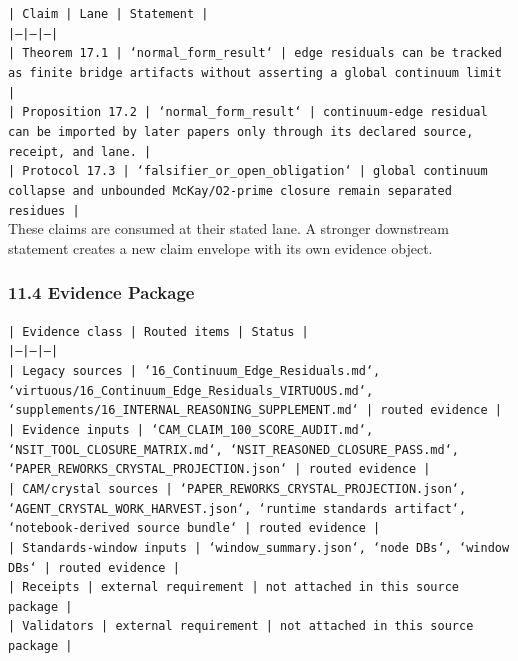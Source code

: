 \documentclass[11pt]{article}
\begin{document}
\noindent\texttt{| Claim | Lane | Statement |}\\
\noindent\texttt{|---|---|---|}\\
\noindent\texttt{| Theorem 17.1 | `normal\_form\_result` | edge residuals can be tracked as finite bridge artifacts without asserting a global continuum limit |}\\
\noindent\texttt{| Proposition 17.2 | `normal\_form\_result` | continuum-edge residual can be imported by later papers only through its declared source, receipt, and lane. |}\\
\noindent\texttt{| Protocol 17.3 | `falsifier\_or\_open\_obligation` | global continuum collapse and unbounded McKay/O2-prime closure remain separated residues |}\\

These claims are consumed at their stated lane. A stronger downstream statement
creates a new claim envelope with its own evidence object.

\subsubsection*{11.4 Evidence Package}

\noindent\texttt{| Evidence class | Routed items | Status |}\\
\noindent\texttt{|---|---|---|}\\
\noindent\texttt{| Legacy sources | `16\_Continuum\_Edge\_Residuals.md`, `virtuous/16\_Continuum\_Edge\_Residuals\_VIRTUOUS.md`, `supplements/16\_INTERNAL\_REASONING\_SUPPLEMENT.md` | routed evidence |}\\
\noindent\texttt{| Evidence inputs | `CAM\_CLAIM\_100\_SCORE\_AUDIT.md`, `NSIT\_TOOL\_CLOSURE\_MATRIX.md`, `NSIT\_REASONED\_CLOSURE\_PASS.md`, `PAPER\_REWORKS\_CRYSTAL\_PROJECTION.json` | routed evidence |}\\
\noindent\texttt{| CAM/crystal sources | `PAPER\_REWORKS\_CRYSTAL\_PROJECTION.json`, `AGENT\_CRYSTAL\_WORK\_HARVEST.json`, `runtime standards artifact`, `notebook-derived source bundle` | routed evidence |}\\
\noindent\texttt{| Standards-window inputs | `window\_summary.json`, `node DBs`, `window DBs` | routed evidence |}\\
\noindent\texttt{| Receipts | external requirement | not attached in this source package |}\\
\noindent\texttt{| Validators | external requirement | not attached in this source package |}\\
\end{document}
